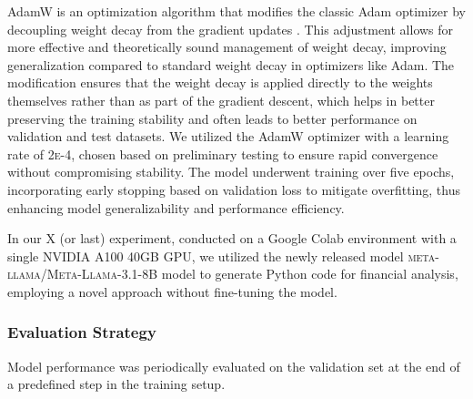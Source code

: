 \documentclass[logo,msc]{infthesis}           %
\begin{document}
AdamW is an optimization algorithm that modifies the classic Adam optimizer by decoupling weight decay from the gradient updates \cite{loshchilov2019decoupledweightdecayregularization}. This adjustment allows for more effective and theoretically sound management of weight decay, improving generalization compared to standard weight decay in optimizers like Adam. The modification ensures that the weight decay is applied directly to the weights themselves rather than as part of the gradient descent, which helps in better preserving the training stability and often leads to better performance on validation and test datasets. We utilized the AdamW optimizer with a learning rate of \textsc{2e-4}, chosen based on preliminary testing to ensure rapid convergence without compromising stability. The model underwent training over five epochs, incorporating early stopping based on validation loss to mitigate overfitting, thus enhancing model generalizability and performance efficiency.

In our X (or last) experiment, conducted on a Google Colab environment with a single NVIDIA A100 40GB GPU, we utilized the newly released model \textsc{meta-llama/Meta-Llama-3.1-8B} model to generate Python code for financial analysis, employing a novel approach without fine-tuning the model. 

\subsubsection*{Evaluation Strategy}
Model performance was periodically evaluated on the validation set at the end of a predefined step in the training setup.

\end{document}
